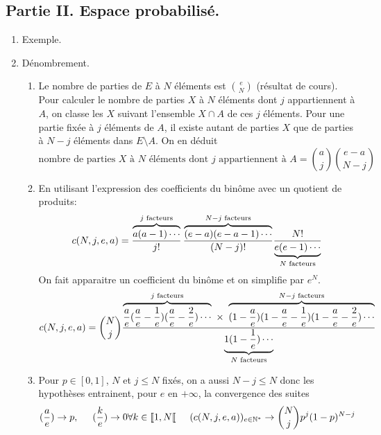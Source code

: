 \subsection*{Partie II. Espace probabilisé.}
\begin{enumerate}
  \item Exemple.
  
  \item Dénombrement.
\begin{enumerate}
  \item Le nombre de parties de $E$ à $N$ éléments est $\binom{e}{N}$ (résultat de cours). Pour calculer le nombre de parties $X$ à $N$ éléments dont $j$ appartiennent à $A$, on classe les $X$ suivant l'ensemble $X\cap A$ de ces $j$ éléments. Pour une partie fixée à $j$ éléments de $A$, il existe autant de parties $X$ que de parties à $N-j$ éléments dans $E\setminus A$. On en déduit
\begin{displaymath}
\text{nombre de parties $X$ à $N$ éléments dont $j$ appartiennent à $A$}
= \binom{a}{j}\binom{e-a}{N-j}
\end{displaymath}

  \item En utilisant l'expression des coefficients du binôme avec un quotient de produits:
\begin{displaymath}
c(N,j,e,a)
=\frac{\overset{j \text{ facteurs}}{\overbrace{a(a-1)\cdots}}}{j!}\,
 \frac{\overset{N-j \text{ facteurs}}{\overbrace{(e-a)(e-a-1)\cdots}}}{(N-j)!}\frac{N!}{\underset{N \text{ facteurs}}{\underbrace{e(e-1)\cdots}}}\\
\end{displaymath}
On fait apparaitre un coefficient du binôme et on simplifie par $e^N$.
\begin{displaymath}
c(N,j,e,a) = \binom{N}{j}
\frac{\overset{j \text{ facteurs}}{\overbrace{\frac{a}{e}(\frac{a}{e}-\frac{1}{e})(\frac{a}{e}-\frac{2}{e}) \cdots}} \; \times \;
       \overset{N-j \text{ facteurs}}{\overbrace{(1-\frac{a}{e})(1-\frac{a}{e}-\frac{1}{e})(1-\frac{a}{e}-\frac{2}{e})\cdots}}}
      {\underset{N \text{ facteurs}}{\underbrace{1(1-\frac{1}{e})\cdots}}}\\
\end{displaymath}

  \item Pour $p\in [0,1]$, $N$ et  $j\leq N$ fixés, on a aussi $N-j\leq N$ donc les hypothèses entrainent, pour $e$ en $+\infty$, la convergence des suites
\begin{displaymath}
(\frac{a}{e})\rightarrow p,\hspace{0.5cm} (\frac{k}{e})\rightarrow 0  \forall k\in \llbracket 1, N\llbracket   \hspace{0.5cm}
(c(N,j,e,a))_{e\in \mathbb{N}^*}\rightarrow \binom{N}{j}p^j (1-p)^{N-j}
\end{displaymath}
\end{enumerate}


\end{enumerate}
